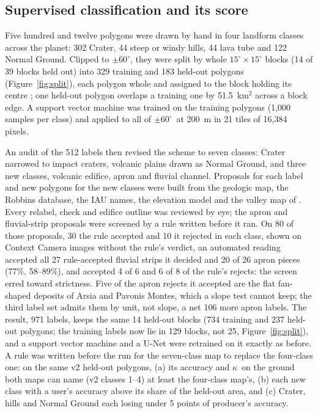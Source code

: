 \documentclass[twocolumn]{aastex701}
\newcommand{\pmsixty}{$\pm60^{\circ}$}
\newcommand{\kap}{$\kappa$}
\begin{document}
\subsection{Supervised classification and its score}

Five hundred and twelve polygons were drawn by hand in four landform classes across the planet: 302 Crater, 44 steep or
windy hills, 44 lava tube and 122 Normal Ground. Clipped to \pmsixty, they were split by whole $15^{\circ}\times15^{\circ}$
blocks (14 of 39 blocks held out) into 329 training and 183 held-out polygons (Figure~\ref{fig:split}), each polygon whole and assigned to the
block holding its centre \citep{Roberts2017}; one held-out polygon overlaps a training one by 51.5~km$^2$ across a
block edge. A support vector machine \citep{Cortes1995} was trained on the
training polygons (1,000 samples per class) and applied to all of \pmsixty\ at 200~m in 21 tiles of 16,384 pixels.

An audit of the 512 labels then revised the scheme to seven classes: Crater narrowed to impact craters, volcanic
plains drawn as Normal Ground, and three new classes, volcanic edifice, apron and fluvial channel. Proposals for each
label and new polygons for the new classes were built from the geologic map, the Robbins database, the IAU names, the
elevation model and the valley map of \citet{Alemanno2018}. Every relabel, check and edifice outline was reviewed by
eye; the apron and fluvial-strip proposals were screened by a rule written before it ran.
On 80 of those proposals, 30 the rule accepted and 10 it rejected in each class, shown on Context Camera images without the
rule's verdict, an automated reading accepted all 27 rule-accepted fluvial strips it decided and 20 of 26 apron pieces
(77\%, 58--89\%), and accepted 4 of 6 and 6 of 8 of the rule's rejects: the screen erred toward strictness. Five
of the apron rejects it accepted are the flat fan-shaped deposits of Arsia and Pavonis Montes, which a slope test
cannot keep; the third label set admits them by unit, not slope, a net 106 more apron labels. %
The result, 971 labels, keeps
the same 14 held-out blocks (734 training and 237 held-out polygons; the training labels now lie in 129 blocks, not 25,
Figure~\ref{fig:split}), and a support vector machine and a U-Net were
retrained on it exactly as before. A rule was written before the run for the seven-class map to replace the
four-class one: on the same v2 held-out polygons, (a) its accuracy and \kap\ on the ground both maps can name (v2
classes 1--4) at least the four-class map's, (b) each new class with a user's accuracy above its share of the
held-out area, and (c) Crater, hills and Normal Ground each losing under 5 points of producer's accuracy.
\end{document}
